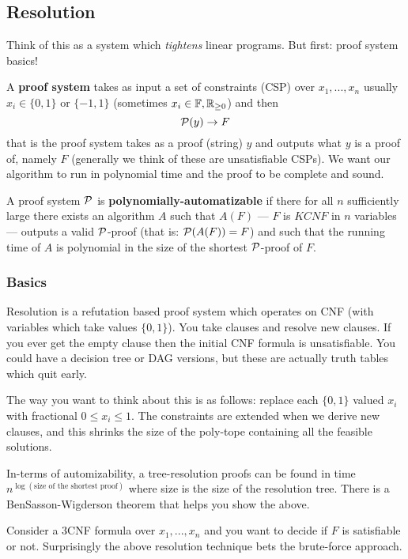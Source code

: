 \subsection{Resolution}
Think of this as a system which \emph{tightens} linear programs. But first: proof system basics!

\begin{definition}
A \textbf{proof system} takes as input a set of constraints (CSP) over $x_1, ..., x_n$ usually $x_i \in \{0,1\}$ or $\{-1, 1\}$ (sometimes $x_i \in \mathbb{F}, \mathbb{R}_{\geq 0}$) and then 
\[\mathcal{P}(y) \rightarrow F\]
that is the proof system takes as a proof (string) $y$ and outputs what $y$ is a proof of, namely $F$ (generally we think of these are unsatisfiable CSPs). We want our algorithm to run in polynomial time and the proof to be complete and sound. 
\end{definition}

\begin{definition}
A proof system $\mathcal{P}$ is \textbf{polynomially-automatizable} if there for all $n$ sufficiently large there exists an algorithm $A$ such that $A(F)$ --- $F$ is $KCNF$ in $n$ variables --- outputs a valid $\mathcal{P}$-proof (that is: $\mathcal{P}(A(F)) = F$) and such that the running time of $A$ is polynomial in the size of the shortest $\mathcal{P}$-proof of $F$.
\end{definition}

\subsubsection{Basics}
Resolution is a refutation based proof system which operates on CNF (with variables which take values $\{0,1\}$). You take clauses and resolve new clauses. If you ever get the empty clause then the initial CNF formula is unsatisfiable. You could have a decision tree or DAG versions, but these are actually truth tables which quit early.  

The way you want to think about this is as follows: replace each $\{0,1\}$ valued $x_i$ with fractional $0 \leq x_i \leq 1$. The constraints are extended when we derive new clauses, and this shrinks the size of the poly-tope containing all the feasible solutions. 

In-terms of automizability, a tree-resolution proofs can be found in time $n^{\log(\mbox{size of the shortest proof})}$ where size is the size of the resolution tree. There is a BenSasson-Wigderson theorem that helps you show the above. 

\begin{example}
Consider a 3CNF formula over $x_1, ..., x_n$ and you want to decide if $F$ is satisfiable or not. Surprisingly the above resolution technique bets the brute-force approach.
\end{example} 
